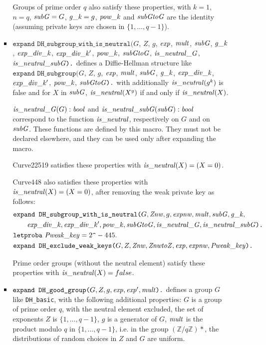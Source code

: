 \documentclass{article}
\begin{document}
\begin{itemize}
\begin{itemize}
\begin{itemize}
Groups of prime order $q$ also satisfy these properties, with $k = 1$, $n = q$, $\mathit{subG} = G$,
$\mathit{g\_k} = g$, $\mathit{pow\_k}$ and $\mathit{subGtoG}$ are the identity (assuming private keys are chosen in 
$\{1, \dots, q-1\}$). 

\item $\texttt{expand\ DH\_subgroup\_with\_is\_neutral(}G$, $Z$, $g$, $\mathit{exp}$, $\mathit{mult}$, $\mathit{subG}$, $\mathit{g\_k}$, $\mathit{exp\_div\_k}$, $\mathit{exp\_div\_k'}$, $\mathit{pow\_k}$, $\mathit{subGtoG}$, $\mathit{is\_neutral\_G}$, $\mathit{is\_neutral\_subG}\texttt{).}$ defines a Diffie-Hellman structure like $\texttt{expand\ DH\_subgroup(}G$, $Z$, $g$, $\mathit{exp}$, $\mathit{mult}$, $\mathit{subG}$, $\mathit{g\_k}$, $\mathit{exp\_div\_k}$, $\mathit{exp\_div\_k'}$, $\mathit{pow\_k}$, $\mathit{subGtoG}\texttt{).}$ with additionally $\mathit{is\_neutral}(g^k)$ is false and for $X$ in $\mathit{subG}$, $\mathit{is\_neutral}(X^y)$ if and only if $\mathit{is\_neutral}(X)$.

       $\mathit{is\_neutral\_G}(G):\mathit{bool}$ and
       $\mathit{is\_neutral\_subG}(\mathit{subG}):\mathit{bool}$ correspond to the
       function $\mathit{is\_neutral}$, respectively on $G$ and on
       $\mathit{subG}$.  These functions are defined by this macro. They
       must not be declared elsewhere, and they can be used only after
       expanding the macro.

       Curve22519 satisfies these properties with $\mathit{is\_neutral}(X) = (X = 0)$.
       
       Curve448 also satisfies these properties with
       $\mathit{is\_neutral}(X) = (X = 0)$, after removing the weak
       private key as follows:
       \begin{align*}
         &\texttt{expand\ DH\_subgroup\_with\_is\_neutral(}G, \vn{Znw}, g, \vn{expnw}, \vn{mult}, \vn{subG}, \vn{g\_k},  \\
         &\qquad \vn{exp\_div\_k}, \vn{exp\_div\_k'}, \vn{pow\_k}, \vn{subGtoG}, \vn{is\_neutral\_G}, \vn{is\_neutral\_subG}\texttt{).}\\
         &\texttt{letproba}\ \vn{Pweak\_key} = 2\texttt{\string^}-445.\\
         &\texttt{expand\ DH\_exclude\_weak\_keys(}G, Z, \vn{Znw}, \vn{ZnwtoZ}, \vn{exp}, \vn{expnw}, \vn{Pweak\_key}\texttt{).}
       \end{align*}
  
  Prime order groups (without the neutral element) satisfy these properties with $\mathit{is\_neutral}(X) = false$.
  
     \item $\texttt{expand\ DH\_good\_group(}G, Z, g, \mathit{exp}, \mathit{exp}', \mathit{mult}\texttt{).}$ defines a group $G$ like
       \texttt{DH\_basic}, with the following additional properties:
       $G$ is a group of prime order $q$, with the neutral element excluded, 
       the set of exponents $Z$ is $\{1, \dots, q-1\}$,
       $g$ is a generator of $G$, 
       $\mathit{mult}$ is the product modulo $q$ in $\{1, \dots, q-1\}$, i.e. in the group $(\mathbb{Z}/q\mathbb{Z})*$,
       the distributions of random choices in $Z$ and $G$ are uniform.


\end{itemize}
\end{itemize}
\end{itemize}
\end{document}
